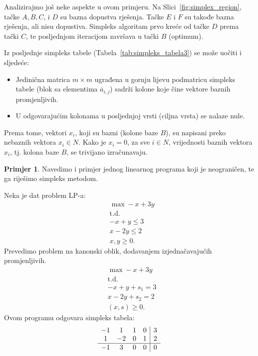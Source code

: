 \documentclass[b5paper, utf8, 11pt, colorlinks]{book}
\theoremstyle{definition}
\newtheorem{primjer}{Primjer}[chapter]
\begin{document}
Analizirajmo još neke aspekte u ovom primjeru. Na Slici~\ref{fig:simplex_region}, tačke $A, B, C$, i $D$ su bazna dopustva rješenja. Tačke $E$ i $F$ su takođe bazna rješenja, ali nisu dopustiva. Simpleks algoritam prvo kreće od tačke $D$ prema tački $C$, te posljednjom iteracijom završava u tački $B$ (optimum).


Iz posljednje simpleks tabele (Tabela~\ref{tab:simpleks_tabela3}) se može uočiti i sljedeće:
\begin{itemize}
	\item Jedinična matrica $m \times m$   ugrađena u gornju lijevu podmatricu simpleks tabele (blok sa elementima $\overline{a}_{i,j}$) sadrži kolone koje čine vektore baznih promjenljivih.
	\item U odgovarajućim kolonama u posljednjoj vrsti (ciljna vrsta) se nalaze nule.
\end{itemize}
Prema tome, vektori $x_i$, koji su bazni (kolone baze $B$), su napisani preko nebaznih vektora $x_i \in N$. Kako je $x_i  = 0$, za sve $i \in N$, vrijednosti baznih vektora $x_i$, tj. kolona baze $B$, se trivijano izračunavaju.

\begin{primjer} Navedimo i primjer jednog linearnog programa koji je neograničen, te ga riješimo simpleks metodom. 
\end{primjer}
Neka je dat problem LP-a:
\begin{align*}
	&\max -x + 3y \\
	&  {\mbox{t.d.}} \nonumber \\
	& -x + y \leq 3 \\
	& x - 2y \leq 2 \\
	& x,y \geq 0.
\end{align*}
Prevedimo problem na kanonski oblik, dodavanjem izjednačavajućih promjenljivih. 
\begin{align*}
	&\max -x + 3y \\
	&  {\mbox{t.d.}} \nonumber \\
	& -x + y + s_1 = 3 \\
	& x - 2y + s_2 = 2  \\
	& (x,s) \geq 0.
\end{align*}
Ovom programu odgovara simpleks tabela:
$$\begin{array}{cccc| c} 
	-1 & 1  & 1 & 0 & 3 \\
	1 & -2 & 0 & 1 & 2 \\ \hline
	-1 & 3  & 0 & 0 & 0  
\end{array}$$
\end{document}
